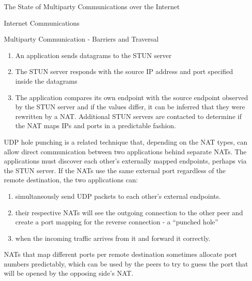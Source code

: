 \begin{frame}[fragile]{The State of Multiparty Communications over the
Internet}
\begin{block}{Internet Communications}
\begin{block}{Multiparty Communication - Barriers and Traversal}
\begin{enumerate}
\tightlist
\item
  An application sends  datagrams to the STUN server
\item
  The STUN server responds with the source IP address and port specified
  inside the datagrams
\item
  The application compares its own endpoint with the source endpoint
  observed by the STUN server and if the values differ, it can be
  inferred that they were rewritten by a NAT. Additional STUN servers
  are contacted to determine if the NAT maps IPs and ports in a
  predictable fashion.
\end{enumerate}

UDP hole punching is a related technique that, depending on the NAT
types, can allow direct communication between two applications behind
separate NATs. The applications must discover each other's externally
mapped endpoints, perhaps via the STUN server.  If the
NATs use the same external port regardless of the remote destination,
the two applications can:

\begin{enumerate}
\tightlist
\item
  simultaneously send UDP packets to each other's external endpoints.
\item
  their respective NATs will see the outgoing connection to the other
  peer and create a port mapping for the reverse connection - a
  ``punched hole''
\item
  when the incoming traffic arrives from it and forward it correctly.
\end{enumerate}

NATs that map different ports per remote destination sometimes allocate
port numbers predictably, which can be used by the peers to try to guess
the port that will be opened by the opposing side's NAT.



\end{block}
\end{block}
\end{frame}

